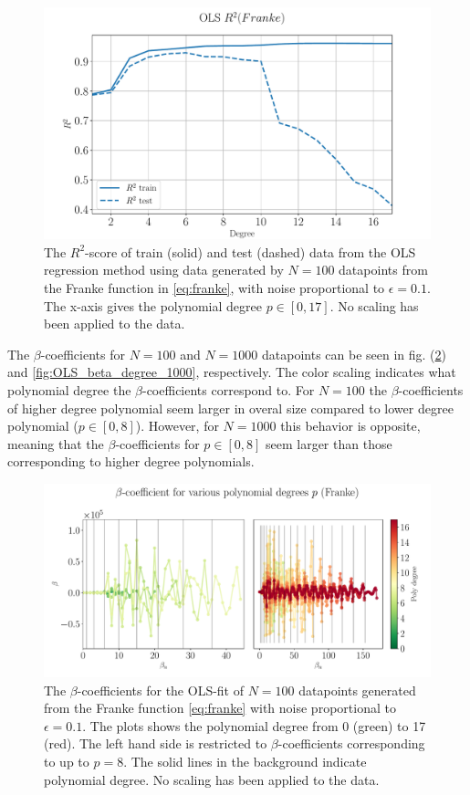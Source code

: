 \documentclass[%
reprint,
amsmath,amssymb,
aps,
pra,
]{revtex4-2}
\begin{document}
\begin{figure}[H]
	\centering
	\includegraphics[width=\linewidth]{Python/Figures/OLS/OLS_R2_no_scaling.pdf}
	\caption{The \(R^2\)-score of train (solid) and test (dashed) data from the OLS regression method using data generated by \(N=100\) datapoints from the Franke function in \eqref{eq:franke}, with noise proportional to \(\epsilon=0.1\). The x-axis gives the polynomial degree \(p\in[0,17]\). No scaling has been applied to the data.}
	\label{fig:OLS_r2_degree}
\end{figure}
The \(\beta\)-coefficients for \(N=100\) and \(N=1000\) datapoints can be seen in fig. (\ref{fig:OLS_beta_degree_100}) and \eqref{fig:OLS_beta_degree_1000}, respectively. The color scaling indicates what polynomial degree the \(\beta\)-coefficients correspond to. For \(N=100\) the \(\beta\)-coefficients of higher degree polynomial seem larger in overal size compared to lower degree polynomial (\(p\in[0,8]\)). However, for \(N=1000\) this behavior is opposite, meaning that the \(\beta\)-coefficients for \(p\in[0,8]\) seem larger than those corresponding to higher degree polynomials.
\begin{figure}[H]
	\hspace{-0.5cm}
	\includegraphics[width=1.25\linewidth]{Python/Figures/OLS/OLS_betano_scaling_100.pdf}
	\caption{The \(\beta\)-coefficients for the OLS-fit of \(N=100\) datapoints generated from the Franke function \eqref{eq:franke} with noise proportional to \(\epsilon=0.1\). The plots shows the polynomial degree from 0 (green) to 17 (red). The left hand side is restricted to \(\beta\)-coefficients corresponding to up to \(p=8\). The solid lines in the background indicate polynomial degree. No scaling has been applied to the data.}
\label{fig:OLS_beta_degree_100}
\end{figure}
\end{document}
